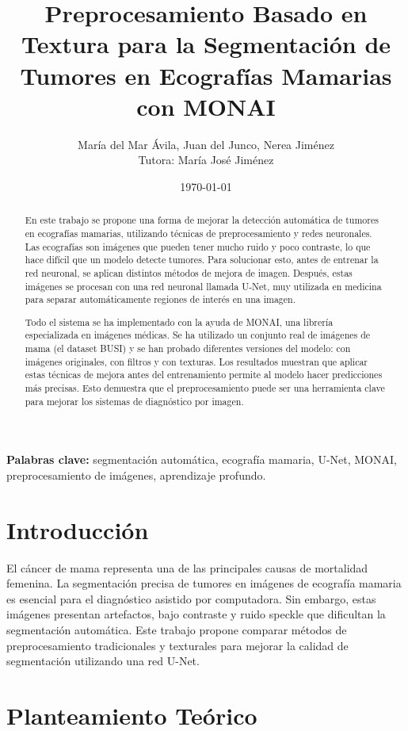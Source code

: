 \documentclass[12pt]{article}
\title{Preprocesamiento Basado en Textura para la Segmentación de Tumores en Ecografías Mamarias con MONAI}
\author{María del Mar Ávila, Juan del Junco, Nerea Jiménez\\Tutora: María José Jiménez}
\date{\today}
\begin{document}
\maketitle

\begin{abstract}
En este trabajo se propone una forma de mejorar la detección automática de tumores en ecografías mamarias, utilizando técnicas de preprocesamiento y redes neuronales. Las ecografías son imágenes que pueden tener mucho ruido y poco contraste, lo que hace difícil que un modelo detecte tumores. Para solucionar esto, antes de entrenar la red neuronal, se aplican distintos métodos de mejora de imagen. Después, estas imágenes se procesan con una red neuronal llamada U-Net, muy utilizada en medicina para separar automáticamente regiones de interés en una imagen.

Todo el sistema se ha implementado con la ayuda de MONAI, una librería especializada en imágenes médicas. Se ha utilizado un conjunto real de imágenes de mama (el dataset BUSI) y se han probado diferentes versiones del modelo: con imágenes originales, con filtros y con texturas. Los resultados muestran que aplicar estas técnicas de mejora antes del entrenamiento permite al modelo hacer predicciones más precisas. Esto demuestra que el preprocesamiento puede ser una herramienta clave para mejorar los sistemas de diagnóstico por imagen.
\end{abstract}

\textbf{Palabras clave:} segmentación automática, ecografía mamaria, U-Net, MONAI, preprocesamiento de imágenes, aprendizaje profundo.

\section{Introducción}
El cáncer de mama representa una de las principales causas de mortalidad femenina. La segmentación precisa de tumores en imágenes de ecografía mamaria es esencial para el diagnóstico asistido por computadora. Sin embargo, estas imágenes presentan artefactos, bajo contraste y ruido speckle que dificultan la segmentación automática. Este trabajo propone comparar métodos de preprocesamiento tradicionales y texturales para mejorar la calidad de segmentación utilizando una red U-Net.

\section{Planteamiento Teórico}
\end{document}
